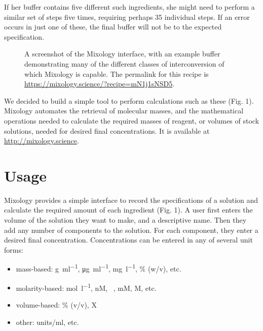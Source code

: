 \documentclass[times, twoside]{zHenriquesLab-StyleBioRxiv}
\begin{document}
If her buffer contains five different such ingredients, she might need to perform a similar set of steps five times, requiring perhaps 35 individual steps. If an error occurs in just one of these, the final buffer will not be to the expected specification.
\begin{figure}[t!]
\centering
{}
\caption{A screenshot of the Mixology interface, with an example buffer demonstrating many of the different classes of interconversion of which Mixology is capable. The permalink for this recipe is \url{https://mixology.science/?recipe=mN1j1sNSD5}.}
\end{figure}

We decided to build a simple tool to perform calculations such as these (Fig. 1). Mixology automates the retrieval of molecular masses, and the mathematical operations needed to calculate the required masses of reagent, or volumes of stock solutions, needed for  desired final concentrations. It is available at \url{http://mixology.science}.

\section*{Usage}

Mixology provides a simple interface to record the specifications of a solution and calculate the required amount of each ingredient (Fig. 1). A user first enters the  volume of the solution they want to make, and a descriptive name. Then they add any number of components to the solution. For each component, they enter a desired final concentration. Concentrations can be entered in any of several unit forms:
\begin{itemize}
    \item mass-based:  \si{\g\per\ml}, \si{\ug\per\ml}, \si{\mg\per\l}, \% (w/v), etc.
    \item molarity-based: \si{\mol\per\l}, nM, \si{\micro\Molar}, mM,  M, etc.
    \item volume-based: \% (v/v), X
    \item other: units/ml, etc.
\end{itemize}
\end{document}
